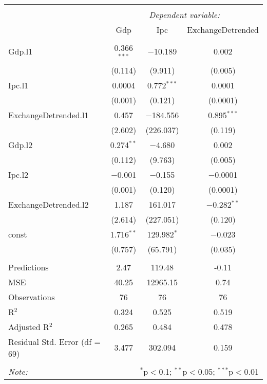 
\begin{table}[H] \centering 
  \caption{} 
  \label{} 
\begin{tabular}{@{\extracolsep{5pt}}lccc} 
\\[-1.8ex]\hline 
\hline \\[-1.8ex] 
 & \multicolumn{3}{c}{\textit{Dependent variable:}} \\ 
\cline{2-4} 
 & Gdp & Ipc & ExchangeDetrended \\ 
\hline \\[-1.8ex] 
 Gdp.l1 & 0.366$^{***}$ & $-$10.189 & 0.002 \\ 
  & (0.114) & (9.911) & (0.005) \\ 
  Ipc.l1 & 0.0004 & 0.772$^{***}$ & 0.0001 \\ 
  & (0.001) & (0.121) & (0.0001) \\ 
  ExchangeDetrended.l1 & 0.457 & $-$184.556 & 0.895$^{***}$ \\ 
  & (2.602) & (226.037) & (0.119) \\ 
  Gdp.l2 & 0.274$^{**}$ & $-$4.680 & 0.002 \\ 
  & (0.112) & (9.763) & (0.005) \\ 
  Ipc.l2 & $-$0.001 & $-$0.155 & $-$0.0001 \\ 
  & (0.001) & (0.120) & (0.0001) \\ 
  ExchangeDetrended.l2 & 1.187 & 161.017 & $-$0.282$^{**}$ \\ 
  & (2.614) & (227.051) & (0.120) \\ 
  const & 1.716$^{**}$ & 129.982$^{*}$ & $-$0.023 \\ 
  & (0.757) & (65.791) & (0.035) \\ 
 \hline \\[-1.8ex] 
Predictions & 2.47 & 119.48 & -0.11 \\ 
MSE & 40.25 & 12965.15 & 0.74 \\ 
Observations & 76 & 76 & 76 \\ 
R$^{2}$ & 0.324 & 0.525 & 0.519 \\ 
Adjusted R$^{2}$ & 0.265 & 0.484 & 0.478 \\ 
Residual Std. Error (df = 69) & 3.477 & 302.094 & 0.159 \\ 
\hline 
\hline \\[-1.8ex] 
\textit{Note:}  & \multicolumn{3}{r}{$^{*}$p$<$0.1; $^{**}$p$<$0.05; $^{***}$p$<$0.01} \\ 
\end{tabular} 
\end{table} 
